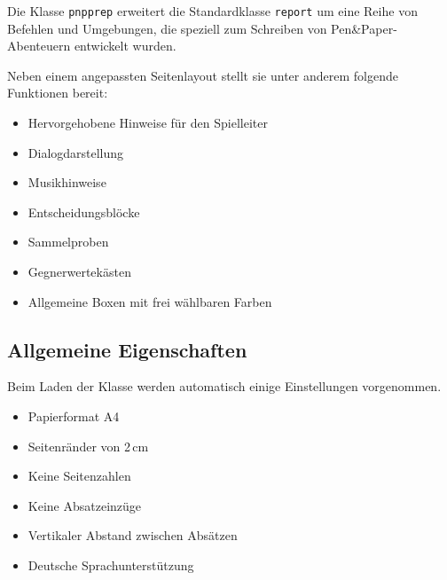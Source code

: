 
Die Klasse \texttt{pnpprep} erweitert die Standardklasse \texttt{report} um eine Reihe von Befehlen und Umgebungen, die speziell zum Schreiben von Pen\&Paper-Abenteuern entwickelt wurden.

Neben einem angepassten Seitenlayout stellt sie unter anderem folgende Funktionen bereit:

\begin{itemize}
\item Hervorgehobene Hinweise für den Spielleiter
\item Dialogdarstellung
\item Musikhinweise
\item Entscheidungsblöcke
\item Sammelproben
\item Gegnerwertekästen
\item Allgemeine Boxen mit frei wählbaren Farben
\end{itemize}

\subsection{Allgemeine Eigenschaften}

Beim Laden der Klasse werden automatisch einige Einstellungen vorgenommen.

\begin{itemize}
\item Papierformat A4
\item Seitenränder von 2\,cm
\item Keine Seitenzahlen
\item Keine Absatzeinzüge
\item Vertikaler Abstand zwischen Absätzen
\item Deutsche Sprachunterstützung
\end{itemize}
